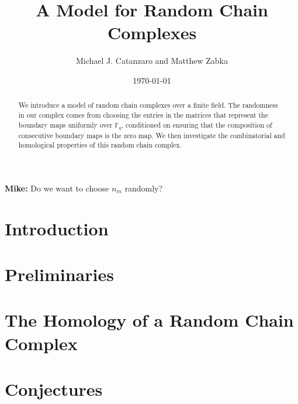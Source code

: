 \documentclass{amsart}
\title{A Model for Random Chain Complexes}
\author{Michael J. Catanzaro and Matthew Zabka}
\date{\today}
\newcommand\mc[1]{\textcolor{NavyBlue}{\textbf{Mike: }#1}}
\begin{document}
\begin{abstract}
We introduce a model of random chain complexes over a finite
field. The randomness in our complex comes from choosing the entries in the
matrices that represent the boundary maps uniformly over $\mathbb{F}_q$,
conditioned on ensuring that the composition of consecutive boundary maps is
the zero map.  We then investigate the combinatorial and homological 
properties of this random chain complex.
\end{abstract}
\maketitle


\mc{Do we want to choose $n_m$ randomly?}
\section{Introduction}

\section{Preliminaries}

\section{The Homology of a Random Chain Complex}\label{SecCondComp}

\section{Conjectures}




  
\end{document}
